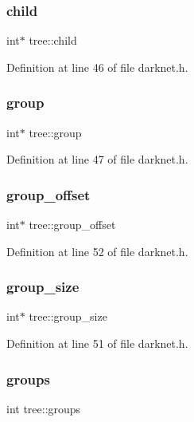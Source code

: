 \subsubsection{\texorpdfstring{child}{child}}
{\footnotesize\ttfamily int$\ast$ tree\+::child}



Definition at line 46 of file darknet.\+h.

\mbox{\label{structtree_a3accabb15b1b96d0f81e40341e55cc20}} 
\subsubsection{\texorpdfstring{group}{group}}
{\footnotesize\ttfamily int$\ast$ tree\+::group}



Definition at line 47 of file darknet.\+h.

\mbox{\label{structtree_a349dec53fea0efa2e19de49785a2f0ff}} 
\subsubsection{\texorpdfstring{group\_offset}{group\_offset}}
{\footnotesize\ttfamily int$\ast$ tree\+::group\+\_\+offset}



Definition at line 52 of file darknet.\+h.

\mbox{\label{structtree_a4b84be443f42bcf6cc16fd9d3fa1f326}} 
\subsubsection{\texorpdfstring{group\_size}{group\_size}}
{\footnotesize\ttfamily int$\ast$ tree\+::group\+\_\+size}



Definition at line 51 of file darknet.\+h.

\mbox{\label{structtree_ab4d92fc866330ea5e427d6b5b8075604}} 
\subsubsection{\texorpdfstring{groups}{groups}}
{\footnotesize\ttfamily int tree\+::groups}




